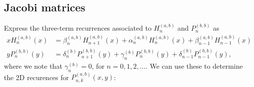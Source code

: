 \documentclass[11pt, oneside]{article}   	%
\begin{document}
\subsection{Jacobi matrices}

Express the three-term recurrences associated to $H_n^{(a,b)}$ and $P_n^{(b,b)}$ as
\begin{align}
x H_n^{(a,b)}(x) &= \beta_n^{(a,b)} H_{n+1}^{(a,b)}(x) + \alpha_n^{(a,b)} H_n^{(a,b)}(x) + \beta_{n-1}^{(a,b)} H_{n-1}^{(a,b)}(x) \\
y P_n^{(b,b)}(y) &= \delta_n^{(b)} P_{n+1}^{(b,b)}(y) + \gamma_n^{(b)} P_n^{(b,b)}(y) + \delta_{n-1}^{(b)} P_{n-1}^{(b,b)}(y),
\end{align}
where we note that \(\gamma_n^{(b)} = 0\), for \( n = 0,1,2,\dots\). We can use these to determine the 2D recurences for $P_{n,k}^{(a,b)}(x,y)$:
\end{document}
